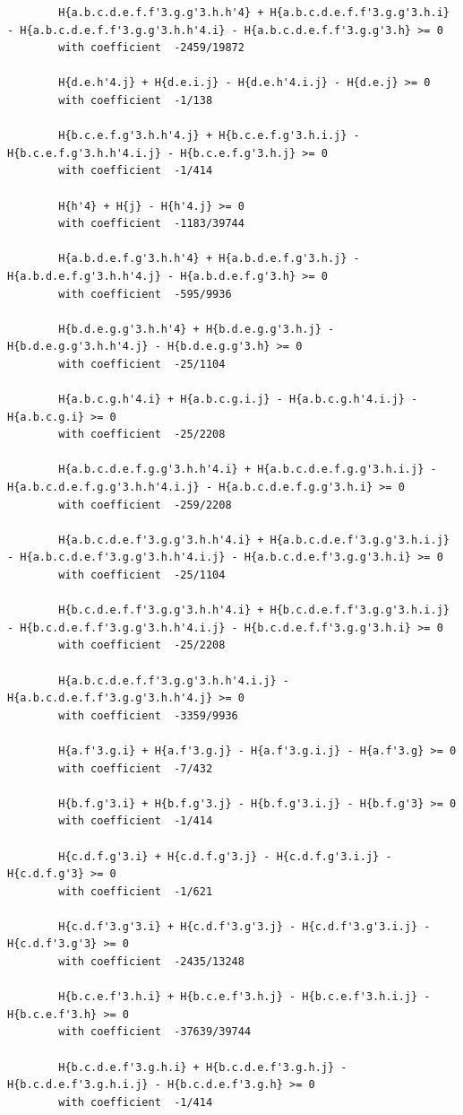 \documentclass[11pt, a4paper]{kybernetika}
\begin{document}
\begin{verbatim}
		H{a.b.c.d.e.f.f'3.g.g'3.h.h'4} + H{a.b.c.d.e.f.f'3.g.g'3.h.i} - H{a.b.c.d.e.f.f'3.g.g'3.h.h'4.i} - H{a.b.c.d.e.f.f'3.g.g'3.h} >= 0
		with coefficient  -2459/19872
		
		H{d.e.h'4.j} + H{d.e.i.j} - H{d.e.h'4.i.j} - H{d.e.j} >= 0
		with coefficient  -1/138
		
		H{b.c.e.f.g'3.h.h'4.j} + H{b.c.e.f.g'3.h.i.j} - H{b.c.e.f.g'3.h.h'4.i.j} - H{b.c.e.f.g'3.h.j} >= 0
		with coefficient  -1/414
		
		H{h'4} + H{j} - H{h'4.j} >= 0
		with coefficient  -1183/39744
		
		H{a.b.d.e.f.g'3.h.h'4} + H{a.b.d.e.f.g'3.h.j} - H{a.b.d.e.f.g'3.h.h'4.j} - H{a.b.d.e.f.g'3.h} >= 0
		with coefficient  -595/9936
		
		H{b.d.e.g.g'3.h.h'4} + H{b.d.e.g.g'3.h.j} - H{b.d.e.g.g'3.h.h'4.j} - H{b.d.e.g.g'3.h} >= 0
		with coefficient  -25/1104
		
		H{a.b.c.g.h'4.i} + H{a.b.c.g.i.j} - H{a.b.c.g.h'4.i.j} - H{a.b.c.g.i} >= 0
		with coefficient  -25/2208
		
		H{a.b.c.d.e.f.g.g'3.h.h'4.i} + H{a.b.c.d.e.f.g.g'3.h.i.j} - H{a.b.c.d.e.f.g.g'3.h.h'4.i.j} - H{a.b.c.d.e.f.g.g'3.h.i} >= 0
		with coefficient  -259/2208
		
		H{a.b.c.d.e.f'3.g.g'3.h.h'4.i} + H{a.b.c.d.e.f'3.g.g'3.h.i.j} - H{a.b.c.d.e.f'3.g.g'3.h.h'4.i.j} - H{a.b.c.d.e.f'3.g.g'3.h.i} >= 0
		with coefficient  -25/1104
		
		H{b.c.d.e.f.f'3.g.g'3.h.h'4.i} + H{b.c.d.e.f.f'3.g.g'3.h.i.j} - H{b.c.d.e.f.f'3.g.g'3.h.h'4.i.j} - H{b.c.d.e.f.f'3.g.g'3.h.i} >= 0
		with coefficient  -25/2208
		
		H{a.b.c.d.e.f.f'3.g.g'3.h.h'4.i.j} - H{a.b.c.d.e.f.f'3.g.g'3.h.h'4.j} >= 0
		with coefficient  -3359/9936
		
		H{a.f'3.g.i} + H{a.f'3.g.j} - H{a.f'3.g.i.j} - H{a.f'3.g} >= 0
		with coefficient  -7/432
		
		H{b.f.g'3.i} + H{b.f.g'3.j} - H{b.f.g'3.i.j} - H{b.f.g'3} >= 0
		with coefficient  -1/414
		
		H{c.d.f.g'3.i} + H{c.d.f.g'3.j} - H{c.d.f.g'3.i.j} - H{c.d.f.g'3} >= 0
		with coefficient  -1/621
		
		H{c.d.f'3.g'3.i} + H{c.d.f'3.g'3.j} - H{c.d.f'3.g'3.i.j} - H{c.d.f'3.g'3} >= 0
		with coefficient  -2435/13248
		
		H{b.c.e.f'3.h.i} + H{b.c.e.f'3.h.j} - H{b.c.e.f'3.h.i.j} - H{b.c.e.f'3.h} >= 0
		with coefficient  -37639/39744
		
		H{b.c.d.e.f'3.g.h.i} + H{b.c.d.e.f'3.g.h.j} - H{b.c.d.e.f'3.g.h.i.j} - H{b.c.d.e.f'3.g.h} >= 0
		with coefficient  -1/414
		

\end{verbatim}
\end{document}
